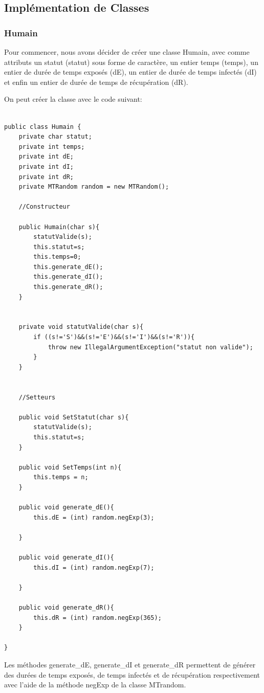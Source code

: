 \documentclass[french]{article}
\begin{document}
\subsection{Implémentation de Classes}

\subsubsection{Humain}
Pour commencer, nous avons décider de créer une classe Humain, avec comme attributs un statut (statut) sous forme de caractère, un entier temps (temps), un entier de durée de temps exposés (dE), un entier de durée de temps infectés (dI) et enfin un entier de durée de temps de récupération (dR).

On peut créer la classe avec le code suivant:

\begin{lstlisting}

public class Humain {
    private char statut;
    private int temps;
    private int dE;
    private int dI;
    private int dR;
    private MTRandom random = new MTRandom();

    //Constructeur

    public Humain(char s){
        statutValide(s);
        this.statut=s;
        this.temps=0;
        this.generate_dE();
        this.generate_dI();
        this.generate_dR();
    }


    private void statutValide(char s){
        if ((s!='S')&&(s!='E')&&(s!='I')&&(s!='R')){
            throw new IllegalArgumentException("statut non valide");
        }
    }


	//Setteurs
	
    public void SetStatut(char s){
        statutValide(s);
        this.statut=s;
    }

    public void SetTemps(int n){
        this.temps = n;
    }

    public void generate_dE(){
        this.dE = (int) random.negExp(3);
        
    }

    public void generate_dI(){
        this.dI = (int) random.negExp(7);
        
    }

    public void generate_dR(){
        this.dR = (int) random.negExp(365);
    }
    
}

\end{lstlisting}
Les méthodes generate\_dE, generate\_dI et generate\_dR permettent de générer des durées de temps exposés, de temps infectés et de récupération respectivement avec l'aide de la méthode negExp de la classe MTrandom.
\end{document}
